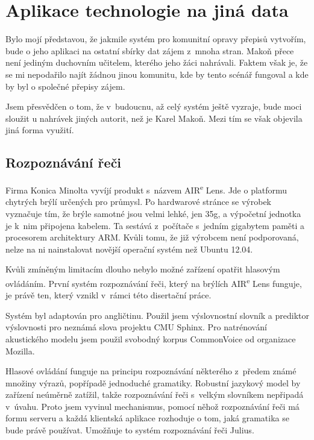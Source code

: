 \chapter{Aplikace technologie na jiná data}
\label{kap:jina-data}

Bylo mojí představou, že jakmile systém pro komunitní opravy přepisů vytvořím,
bude o jeho aplikaci na ostatní sbírky dat zájem z~mnoha stran. Makoň přece není
jediným duchovním učitelem, kterého jeho žáci nahrávali. Faktem však je, že se mi
nepodařilo najít žádnou jinou komunitu, kde by tento scénář fungoval a kde by
byl o společné přepisy zájem.

Jsem přesvědčen o tom, že v~budoucnu, až celý systém ještě vyzraje, bude moci
sloužit u nahrávek jiných autorit, než je Karel Makoň. Mezi tím se však objevila jiná
forma využití.

\section{Rozpoznávání řeči}

Firma Konica Minolta vyvíjí produkt s~názvem AIR\textsuperscript{e} Lens. Jde o platformu
chytrých brýlí určených pro průmysl. Po hardwarové stránce se výrobek vyznačuje
tím, že brýle samotné jsou velmi lehké, jen 35g, a výpočetní jednotka je k~nim
připojena kabelem. Ta sestává z~počítače s~jedním gigabytem paměti a procesorem
architektury ARM. Kvůli tomu, že již výrobcem není podporovaná, nelze na ni
nainstalovat novější operační systém než Ubuntu 12.04.

Kvůli zmíněným limitacím dlouho nebylo možné zařízení opatřit hlasovým
ovládáním. První systém rozpoznávání řeči, který na brýlích AIR\textsuperscript{e} Lens
funguje, je právě ten, který vznikl v~rámci této disertační práce.

Systém byl adaptován pro angličtinu. Použil jsem výslovnostní slovník a
prediktor výslovnosti pro neznámá slova projektu CMU Sphinx\cite{huggins2006pocketsphinx}\cite{lamere2003cmu}.
Pro natrénování akustického modelu jsem použil svobodný korpus CommonVoice od
organizace Mozilla.

Hlasové ovládání funguje na principu rozpoznávání některého z~předem známé
množiny výrazů, popřípadě jednoduché gramatiky. Robustní jazykový model by
zařízení neúměrně zatížil, takže rozpoznávání řeči s~velkým slovníkem nepřipadá
v~úvahu. Proto jsem vyvinul mechanismus, pomocí něhož
rozpoznávání řeči má formu serveru a každá klientská aplikace rozhoduje o tom,
jaká gramatika se bude právě používat. Umožňuje to systém rozpoznávání řeči
Julius\cite{lee2001julius}\cite{lee2009recent}.

